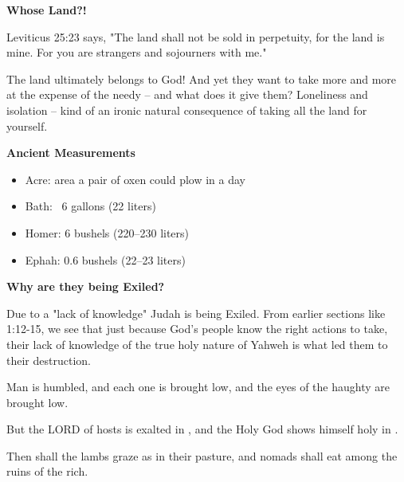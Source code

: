 \documentclass[11pt]{article}
\begin{document}
\newpage
{\large\bfseries Whose Land?!}
\vspace{1em}

Leviticus 25:23 says, "The land shall not be sold in perpetuity, for the land is mine. For you are strangers and sojourners with me."

{\vspace{1em}}
The land ultimately belongs to God! And yet they want to take more and more at the expense of the needy – and what does it give them? Loneliness and isolation – kind of an ironic natural consequence of taking all the land for yourself.


\vspace{3em}
{\large\bfseries Ancient Measurements}

\begin{itemize}
    \item Acre: area a pair of oxen could plow in a day
    \item Bath: ~6 gallons (22 liters)
    \item Homer: 6 bushels (220–230 liters)
    \item Ephah: 0.6 bushels (22–23 liters)
\end{itemize}

\vspace{1em}

\vspace{3em}
{\large\bfseries Why are they being Exiled?}
\vspace{1em}

Due to a "lack of knowledge" Judah is being Exiled. From earlier sections like 1:12-15, we see that just because God's people know the right actions to take, their lack of knowledge of the true holy nature of Yahweh is what led them to their destruction.
\newpage
\begin{biblicaloutline}[Isaiah 5:15-17 (C)]

    \begin{versesection}{2em}
         Man is humbled, and each one is brought low,
        \poetryline and the eyes of the haughty are brought low.
        
         But the LORD of hosts is exalted in ,
        \poetryline and the Holy God shows himself holy in .
        
         Then shall the lambs graze as in their pasture,
        \poetryline and nomads shall eat among the ruins of the rich.
    \end{versesection}

\end{biblicaloutline}
\end{document}
